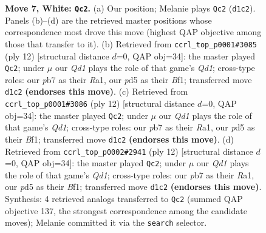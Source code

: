 \documentclass[11pt]{article}
\begin{document}
\begin{figure}[p]
\caption{\textbf{Move 7, White: \texttt{Qc2}.} (a) Our position; Melanie plays \texttt{Qc2} (\texttt{d1c2}). Panels (b)--(d) are the retrieved master positions whose correspondence most drove this move (highest QAP objective among those that transfer to it). (b) Retrieved from \texttt{ccrl\_top\_p0001\#3085} (ply 12) [structural distance $d$=0, QAP obj=34]: the master played \texttt{Qc2}; under $\mu$ our \emph{Qd1} plays the role of that game's \emph{Qd1}; cross-type roles: our \emph{p}b7 as their \emph{R}a1, our \emph{p}d5 as their \emph{B}f1; transferred move \texttt{d1c2} \textbf{(endorses this move)}. (c) Retrieved from \texttt{ccrl\_top\_p0001\#3086} (ply 12) [structural distance $d$=0, QAP obj=34]: the master played \texttt{Qc2}; under $\mu$ our \emph{Qd1} plays the role of that game's \emph{Qd1}; cross-type roles: our \emph{p}b7 as their \emph{R}a1, our \emph{p}d5 as their \emph{B}f1; transferred move \texttt{d1c2} \textbf{(endorses this move)}. (d) Retrieved from \texttt{ccrl\_top\_p0002\#2941} (ply 12) [structural distance $d$=0, QAP obj=34]: the master played \texttt{Qc2}; under $\mu$ our \emph{Qd1} plays the role of that game's \emph{Qd1}; cross-type roles: our \emph{p}b7 as their \emph{R}a1, our \emph{p}d5 as their \emph{B}f1; transferred move \texttt{d1c2} \textbf{(endorses this move)}. Synthesis: 4 retrieved analogs transferred to \texttt{Qc2} (summed QAP objective 137, the strongest correspondence among the candidate moves); Melanie committed it via the \texttt{search} selector.}
\label{fig:thought-m12}
\end{figure}

\clearpage
\end{document}

